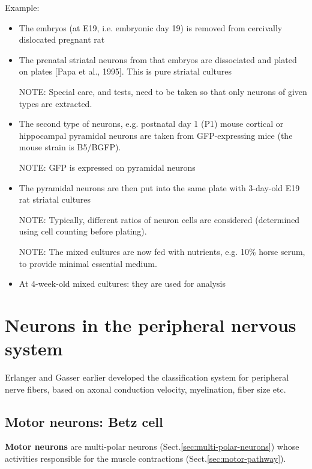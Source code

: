 Example:
\begin{itemize}
  \item The embryos (at E19, i.e. embryonic day 19) is removed from cercivally
  dislocated pregnant rat
  
  \item The prenatal striatal neurons from that embryos are dissociated and
  plated on plates [Papa et al., 1995]. This is pure striatal cultures
  
  NOTE: Special care, and tests, need to be taken so that only neurons of given
  types are extracted.
  
  \item The second type of neurons, e.g. postnatal day 1 (P1) mouse cortical or
  hippocampal pyramidal neurons are taken from GFP-expressing mice (the mouse
  strain is B5/BGFP).
  
  NOTE: GFP is expressed on pyramidal neurons
  
  \item The pyramidal neurons are then put into the same plate with 3-day-old
  E19 rat striatal cultures
  
  NOTE: Typically, different ratios of neuron cells are considered (determined
  using cell counting before plating).
  
  NOTE: The mixed cultures are now fed with nutrients, e.g. 10\% horse serum, 
  to provide minimal essential medium.
  
  
  \item At 4-week-old mixed cultures: they are used for analysis
\end{itemize} 


\chapter{Neurons in the peripheral nervous system}
\label{sec:neurons-in-PNS}
\label{sec:nerve-fiber}

Erlanger and Gasser earlier developed the classification system for peripheral
nerve fibers, based on axonal conduction velocity, myelination, fiber size etc.

\section{Motor neurons: Betz cell}
\label{sec:motor-neuron}
\label{sec:Betz-cell}

{\bf Motor neurons} are multi-polar neurons (Sect.\ref{sec:multi-polar-neurons})
whose activities responsible for the muscle contractions
(Sect.\ref{sec:motor-pathway}).

